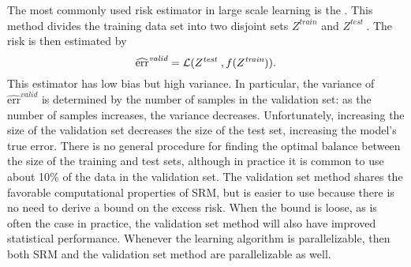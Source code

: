 \documentclass[thesis.tex]{subfiles}
\newcommand{\riskstar}{{\textrm{err}^*}}
\newcommand{\riskvalid}{\widehat{\textrm{err}}^\textit{valid}}
\begin{document}
\newcommand{\Ztrain}{Z^\textit{train}}
\newcommand{\Ztest }{Z^\textit{test }}
\newcommand{\ntrain}{n^\textit{train}}
\newcommand{\ntest }{n^\textit{test }}
The most commonly used risk estimator in large scale learning is the 
\citep[Chapter 11 of ][]{shalev2014understanding}.
This method divides the training data set into two disjoint sets $\Ztrain$ and $\Ztest$.
The risk is then estimated by
\begin{equation}
    \riskvalid = \Loss(\Ztest,f(\Ztrain))
    .
\end{equation}
This estimator has low bias but high variance.
In particular, the variance of $\riskvalid$ is determined by the number of samples in the validation set:
as the number of samples increases, the variance decreases.
Unfortunately, increasing the size of the validation set decreases the size of the test set,
increasing the model's true error.
There is no general procedure for finding the optimal balance between the size of the training and test sets,
although in practice it is common to use about 10\% of the data in the validation set.
The validation set method shares the favorable computational properties of SRM,
but is easier to use because there is no need to derive a bound on the excess risk.
When the bound is loose, as is often the case in practice, the validation set method will also have improved statistical performance.
Whenever the learning algorithm is parallelizable,
then both SRM and the validation set method are parallelizable as well.
\end{document}
